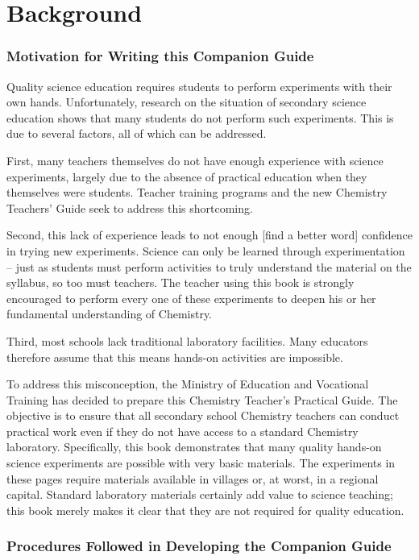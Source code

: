 \chapter*{Background}

\subsection*{Motivation for Writing this Companion Guide}

Quality science education requires students to perform experiments with their own hands. Unfortunately, research on the situation of secondary science education shows that many students do not perform such experiments. This is due to several factors, all of which can be addressed.

First, many teachers themselves do not have enough experience with science experiments, largely due to the absence of practical education when they themselves were students. Teacher training programs and the new Chemistry Teachers' Guide seek to address this shortcoming.

Second, this lack of experience leads to not enough [find a better word] confidence in trying new experiments. Science can only be learned through experimentation -- just as students must perform activities to truly understand the material on the syllabus, so too must teachers. The teacher using this book is strongly encouraged to perform every one of these experiments to deepen his or her fundamental understanding of Chemistry.

Third, most schools lack traditional laboratory facilities. Many educators therefore assume that this means hands-on activities are impossible.

To address this misconception, the Ministry of Education and Vocational Training has decided to prepare this Chemistry Teacher's Practical Guide. The objective is to ensure that all secondary school Chemistry teachers can conduct practical work even if they do not have access to a standard Chemistry laboratory. Specifically, this book demonstrates that many quality hands-on science experiments are possible with very basic materials. The experiments in these pages require materials available in villages or, at worst, in a regional capital. Standard laboratory materials certainly add value to science teaching; this book merely makes it clear that they are not required for quality education.

\subsection*{Procedures Followed in Developing the Companion Guide}


